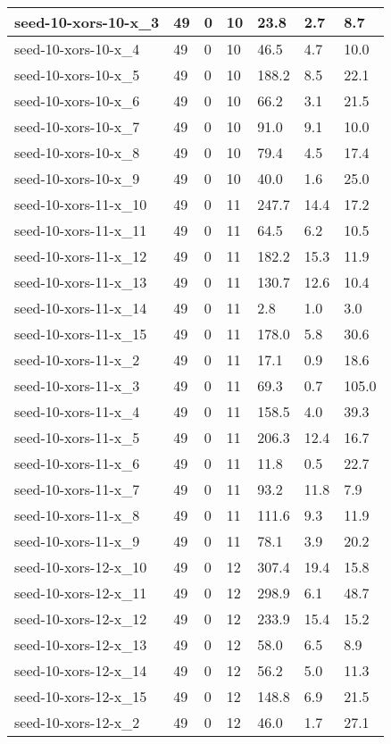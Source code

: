 \begin{scriptsize}
\begin{longtable}{|p{5cm}|l|l|l|l|l|l|}
seed-10-xors-10-x\_3&49&0&10&23.8&2.7&8.7 \\ \hline 
seed-10-xors-10-x\_4&49&0&10&46.5&4.7&10.0 \\ \hline 
seed-10-xors-10-x\_5&49&0&10&188.2&8.5&22.1 \\ \hline 
seed-10-xors-10-x\_6&49&0&10&66.2&3.1&21.5 \\ \hline 
seed-10-xors-10-x\_7&49&0&10&91.0&9.1&10.0 \\ \hline 
seed-10-xors-10-x\_8&49&0&10&79.4&4.5&17.4 \\ \hline 
seed-10-xors-10-x\_9&49&0&10&40.0&1.6&25.0 \\ \hline 
seed-10-xors-11-x\_10&49&0&11&247.7&14.4&17.2 \\ \hline 
seed-10-xors-11-x\_11&49&0&11&64.5&6.2&10.5 \\ \hline 
seed-10-xors-11-x\_12&49&0&11&182.2&15.3&11.9 \\ \hline 
seed-10-xors-11-x\_13&49&0&11&130.7&12.6&10.4 \\ \hline 
seed-10-xors-11-x\_14&49&0&11&2.8&1.0&3.0 \\ \hline 
seed-10-xors-11-x\_15&49&0&11&178.0&5.8&30.6 \\ \hline 
seed-10-xors-11-x\_2&49&0&11&17.1&0.9&18.6 \\ \hline 
seed-10-xors-11-x\_3&49&0&11&69.3&0.7&105.0 \\ \hline 
seed-10-xors-11-x\_4&49&0&11&158.5&4.0&39.3 \\ \hline 
seed-10-xors-11-x\_5&49&0&11&206.3&12.4&16.7 \\ \hline 
seed-10-xors-11-x\_6&49&0&11&11.8&0.5&22.7 \\ \hline 
seed-10-xors-11-x\_7&49&0&11&93.2&11.8&7.9 \\ \hline 
seed-10-xors-11-x\_8&49&0&11&111.6&9.3&11.9 \\ \hline 
seed-10-xors-11-x\_9&49&0&11&78.1&3.9&20.2 \\ \hline 
seed-10-xors-12-x\_10&49&0&12&307.4&19.4&15.8 \\ \hline 
seed-10-xors-12-x\_11&49&0&12&298.9&6.1&48.7 \\ \hline 
seed-10-xors-12-x\_12&49&0&12&233.9&15.4&15.2 \\ \hline 
seed-10-xors-12-x\_13&49&0&12&58.0&6.5&8.9 \\ \hline 
seed-10-xors-12-x\_14&49&0&12&56.2&5.0&11.3 \\ \hline 
seed-10-xors-12-x\_15&49&0&12&148.8&6.9&21.5 \\ \hline 
seed-10-xors-12-x\_2&49&0&12&46.0&1.7&27.1 \\ \hline 

\end{longtable}
\end{scriptsize}
